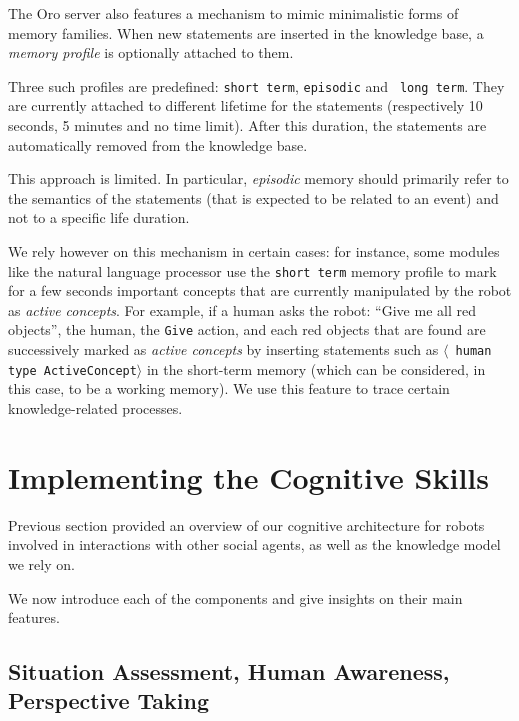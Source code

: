 \documentclass[preprint,3p,times]{elsarticle}
\newcommand{\concept}[1]{{\small \texttt{#1}}}
\newcommand{\stmt}[1]{{\footnotesize \tt $\langle$ #1\relax$\rangle$}}
\begin{document}
The {\sc Oro} server also features a mechanism to mimic minimalistic forms of
memory families.  When new statements are inserted in the knowledge base, a
\emph{memory profile} is optionally attached to them.

Three such profiles are predefined: {\tt short term}, {\tt episodic} and {\tt
long term}. They are currently attached to different lifetime for the statements
(respectively 10 seconds, 5 minutes and no time limit). After this duration,
the statements are automatically removed from the knowledge base.

This approach is limited. In particular, \emph{episodic} memory should primarily
refer to the semantics of the statements (that is expected to be related to an
event) and not to a specific life duration.

We rely however on this mechanism in certain cases: for instance, some modules
like the natural language processor use the {\tt short term} memory profile to
mark for a few seconds important concepts that are currently manipulated by the
robot as \emph{active concepts}. For example, if a human asks the robot: ``Give
me all red objects'', the human, the \concept{Give} action, and each red
objects that are found are successively marked as \emph{active concepts} by
inserting statements such as \stmt{human type ActiveConcept} in the short-term
memory (which can be considered, in this case, to be a working memory). We use
this feature to trace certain knowledge-related processes.


\section{Implementing the Cognitive Skills}
\label{sec:impl}

Previous section provided an overview of our cognitive architecture for robots
involved in interactions with other social agents, as well as the knowledge
model we rely on.

We now introduce each of the components and give insights on their main
features.


\subsection{Situation Assessment, Human Awareness, Perspective Taking}
\label{sect|sit-ass}
\end{document}
